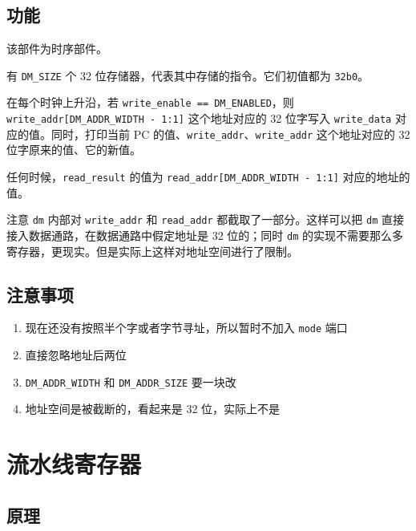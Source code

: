 \documentclass[12pt,AutoFakeBold,AutoFakeSlant]{article}
\providecommand{\tightlist}{%
  \setlength{\itemsep}{0pt}\setlength{\parskip}{0pt}}
\begin{document}
\hypertarget{ux529fux80fd-8}{%
\subsection{功能}\label{ux529fux80fd-8}}

该部件为时序部件。

有 \texttt{DM\_SIZE} 个 32 位存储器，代表其中存储的指令。它们初值都为
\texttt{32\textquotesingle{}b0}。

在每个时钟上升沿，若 \texttt{write\_enable\ ==\ DM\_ENABLED}，则
\texttt{write\_addr{[}DM\_ADDR\_WIDTH\ -\ 1:1{]}} 这个地址对应的 32
位字写入 \texttt{write\_data} 对应的值。同时，打印当前 PC
的值、\texttt{write\_addr}、\texttt{write\_addr} 这个地址对应的 32
位字原来的值、它的新值。

任何时候，\texttt{read\_result} 的值为
\texttt{read\_addr{[}DM\_ADDR\_WIDTH\ -\ 1:1{]}} 对应的地址的值。

注意 \texttt{dm} 内部对 \texttt{write\_addr} 和 \texttt{read\_addr}
都截取了一部分。这样可以把 \texttt{dm}
直接接入数据通路，在数据通路中假定地址是 32 位的；同时 \texttt{dm}
的实现不需要那么多寄存器，更现实。但是实际上这样对地址空间进行了限制。

\hypertarget{ux6ce8ux610fux4e8bux9879-5}{%
\subsection{注意事项}\label{ux6ce8ux610fux4e8bux9879-5}}

\begin{enumerate}
\def\labelenumi{\arabic{enumi}.}
\tightlist
\item
  现在还没有按照半个字或者字节寻址，所以暂时不加入 \texttt{mode} 端口
\item
  直接忽略地址后两位
\item
  \texttt{DM\_ADDR\_WIDTH} 和 \texttt{DM\_ADDR\_SIZE} 要一块改
\item
  地址空间是被截断的，看起来是 32 位，实际上不是
\end{enumerate}

\hypertarget{ux6d41ux6c34ux7ebfux5bc4ux5b58ux5668}{%
\section{流水线寄存器}\label{ux6d41ux6c34ux7ebfux5bc4ux5b58ux5668}}

\hypertarget{ux539fux7406-7}{%
\subsection{原理}\label{ux539fux7406-7}}
\end{document}
